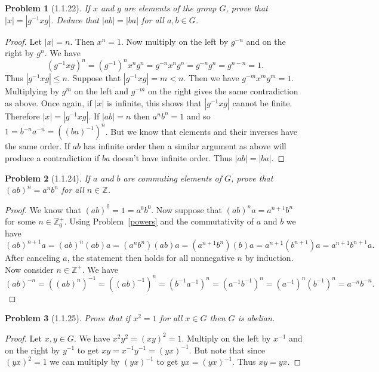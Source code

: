 \documentclass{article}
\newtheorem{problem}{Problem}
\begin{document}
\begin{problem}[1.1.22]
If $x$ and $g$ are elements of the group $G$, prove that $|x| = |g^{-1}xg|$. Deduce that $|ab| = |ba|$ for all $a,b \in G$.
\end{problem}
\begin{proof}
Let $|x| = n$. Then $x^n = 1$. Now multiply on the left by $g^{-n}$ and on the right by $g^n$. We have
\[
(g^{-1} x g)^n = (g^{-1})^n x^n g^n = g^{-n} x^n g^n = g^{-n}g^n = g^{n - n} = 1.
\]
Thus $|g^{-1}xg| \leq n$. Suppose that $|g^{-1}xg| = m < n$. Then we have $g^{-m}x^mg^m = 1$. Multiplying by $g^m$ on the left and $g^{-m}$ on the right gives the same contradiction as above. Once again, if $|x|$ is infinite, this shows that $|g^{-1}xg|$ cannot be finite. Therefore $|x| = |g^{-1}xg|$. If $|ab| = n$ then $a^nb^n = 1$ and so $1 = b^{-n}a^{-n} = ((ba)^{-1})^n$. But we know that elements and their inverses have the same order. If $ab$ has infinite order then a similar argument as above will produce a contradiction if $ba$ doesn't have infinite order. Thus $|ab| = |ba|$.
\end{proof}

\begin{problem}[1.1.24]
\label{commute}
If $a$ and $b$ are \emph{commuting} elements of $G$, prove that $(ab)^n = a^nb^n$ for all $n \in \mathbb{Z}$.
\end{problem}
\begin{proof}
We know that $(ab)^0 = 1 = a^0 b^0$. Now suppose that $(ab)^na = a^{n+1} b^n$ for some $n \in \mathbb{Z}_0^+$. Using Problem~\ref{powers} and the commutativity of $a$ and $b$ we have
\[
(ab)^{n+1}a = (ab)^n(ab)a = (a^nb^n)(ab)a = (a^{n+1}b^n)(b)a = a^{n+1}(b^{n+1})a = a^{n+1}b^{n+1}a.
\]
After canceling $a$, the statement then holds for all nonnegative $n$ by induction. Now consider $n \in \mathbb{Z}^+$. We have
\[
(ab)^{-n} = \left ( (ab)^n \right )^{-1} = \left ( (ab)^{-1} \right )^{n} = (b^{-1}a^{-1})^n = (a^{-1}b^{-1})^n = (a^{-1})^n(b^{-1})^n = a^{-n}b^{-n}.
\]
\end{proof}

\begin{problem}[1.1.25]
Prove that if $x^2 = 1$ for all $x \in G$ then $G$ is abelian.
\end{problem}
\begin{proof}
Let $x, y \in G$. We have $x^2y^2 = (xy)^2 = 1$. Multiply on the left by $x^{-1}$ and on the right by $y^{-1}$ to get $xy = x^{-1}y^{-1} = (yx)^{-1}$. But note that since $(yx)^2 = 1$ we can multiply by $(yx)^{-1}$ to get $yx = (yx)^{-1}$. Thus $xy = yx$.
\end{proof}
\end{document}
